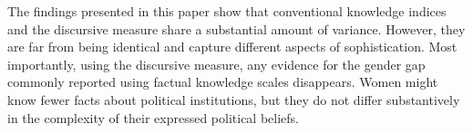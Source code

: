 \documentclass[12pt]{article}
\begin{document}
The findings presented in this paper show that conventional knowledge indices and the discursive measure share a substantial amount of variance. However, they are far from being identical and capture different aspects of sophistication. Most importantly, using the discursive measure, any evidence for the gender gap commonly reported using factual knowledge scales disappears. Women might know fewer facts about political institutions, but they do not differ substantively in the complexity of their expressed political beliefs.

\singlespacing



%
%
%
\end{document}
